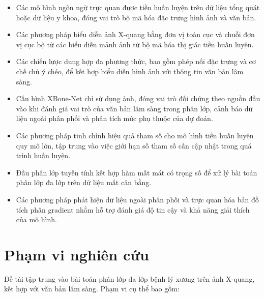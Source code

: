 \begin{itemize}
\item Các mô hình ngôn ngữ trực quan được tiền huấn luyện trên dữ liệu tổng quát hoặc dữ liệu y khoa, đóng vai trò bộ mã hóa đặc trưng hình ảnh và văn bản.

\item Các phương pháp biểu diễn ảnh X-quang bằng đơn vị toàn cục và chuỗi đơn vị cục bộ từ các biểu diễn mảnh ảnh từ bộ mã hóa thị giác tiền huấn luyện.

\item Các chiến lược dung hợp đa phương thức, bao gồm phép nối đặc trưng và cơ chế chú ý chéo, để kết hợp biểu diễn hình ảnh với thông tin văn bản lâm sàng.

\item Cấu hình XBone-Net chỉ sử dụng ảnh, đóng vai trò đối chứng theo nguồn đầu vào khi đánh giá vai trò của văn bản lâm sàng trong phân lớp, cảnh báo dữ liệu ngoài phân phối và phân tích mức phụ thuộc của dự đoán.

\item Các phương pháp tinh chỉnh hiệu quả tham số cho mô hình tiền huấn luyện quy mô lớn, tập trung vào việc giới hạn số tham số cần cập nhật trong quá trình huấn luyện.

\item Đầu phân lớp tuyến tính kết hợp hàm mất mát có trọng số để xử lý bài toán phân lớp đa lớp trên dữ liệu mất cân bằng.

\item Các phương pháp phát hiện dữ liệu ngoài phân phối và trực quan hóa bản đồ tích phân gradient nhằm hỗ trợ đánh giá độ tin cậy và khả năng giải thích của mô hình.

\end{itemize}

\section{Phạm vi nghiên cứu}
Đề tài tập trung vào bài toán phân lớp đa lớp bệnh lý xương trên ảnh X-quang, kết hợp với văn bản lâm sàng. Phạm vi cụ thể bao gồm:

